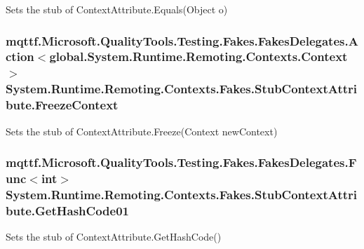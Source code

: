 Sets the stub of Context\-Attribute.\-Equals(\-Object o)

\hypertarget{class_system_1_1_runtime_1_1_remoting_1_1_contexts_1_1_fakes_1_1_stub_context_attribute_ac11f52aafe6255acd4dfc63bb7e53b0a}{
\subsubsection[{Freeze\-Context}]{\setlength{\rightskip}{0pt plus 5cm}mqttf.\-Microsoft.\-Quality\-Tools.\-Testing.\-Fakes.\-Fakes\-Delegates.\-Action$<$global.\-System.\-Runtime.\-Remoting.\-Contexts.\-Context$>$ System.\-Runtime.\-Remoting.\-Contexts.\-Fakes.\-Stub\-Context\-Attribute.\-Freeze\-Context}}\label{class_system_1_1_runtime_1_1_remoting_1_1_contexts_1_1_fakes_1_1_stub_context_attribute_ac11f52aafe6255acd4dfc63bb7e53b0a}


Sets the stub of Context\-Attribute.\-Freeze(\-Context new\-Context)

\hypertarget{class_system_1_1_runtime_1_1_remoting_1_1_contexts_1_1_fakes_1_1_stub_context_attribute_a53c2f80fc312b8030ee6ca4c35db12b7}{
\subsubsection[{Get\-Hash\-Code01}]{\setlength{\rightskip}{0pt plus 5cm}mqttf.\-Microsoft.\-Quality\-Tools.\-Testing.\-Fakes.\-Fakes\-Delegates.\-Func$<$int$>$ System.\-Runtime.\-Remoting.\-Contexts.\-Fakes.\-Stub\-Context\-Attribute.\-Get\-Hash\-Code01}}\label{class_system_1_1_runtime_1_1_remoting_1_1_contexts_1_1_fakes_1_1_stub_context_attribute_a53c2f80fc312b8030ee6ca4c35db12b7}


Sets the stub of Context\-Attribute.\-Get\-Hash\-Code()

